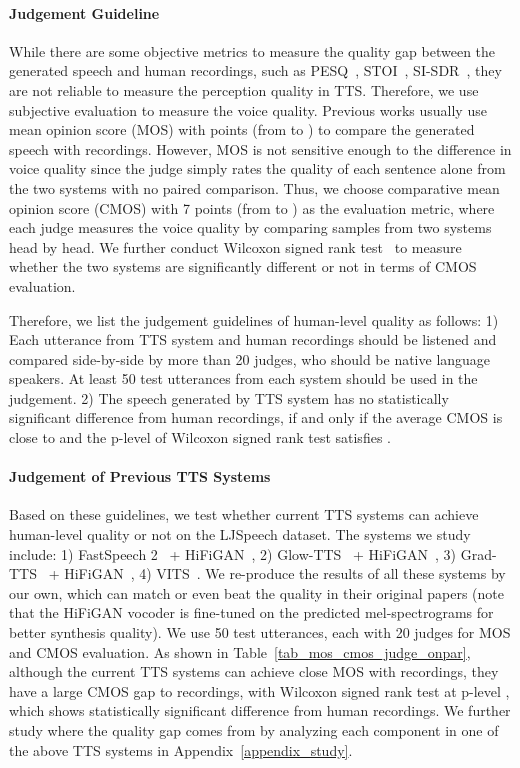 \documentclass{article}
\theoremstyle{definition}
\begin{document}
\paragraph{Judgement Guideline} While there are some objective metrics to measure the quality gap between the generated speech and human recordings, such as PESQ~\citep{rix2001perceptual}, STOI~\citep{taal2011algorithm}, SI-SDR~\citep{le2019sdr}, they are not reliable to measure the perception quality in TTS. Therefore, we use subjective evaluation to measure the voice quality. Previous works usually use mean opinion score (MOS) with  points (from  to ) to compare the generated speech with recordings. However, MOS is not sensitive enough to the difference in voice quality since the judge simply rates the quality of each sentence alone from the two systems with no paired comparison. Thus, we choose comparative mean opinion score (CMOS) with 7 points (from  to ) as the evaluation metric, where each judge measures the voice quality by comparing samples from two systems head by head. We further conduct Wilcoxon signed rank test~\citep{wilcoxon1992individual} to measure whether the two systems are significantly different or not in terms of CMOS evaluation. 

Therefore, we list the judgement guidelines of human-level quality as follows: 1) Each utterance from TTS system and human recordings should be listened and compared side-by-side by more than 20 judges, who should be native language speakers. At least 50 test utterances from each system should be used in the judgement.
2) The speech generated by TTS system has no statistically significant difference from human recordings, if and only if the average CMOS is close to  and the p-level of Wilcoxon signed rank test satisfies . 

\paragraph{Judgement of Previous TTS Systems} 
Based on these guidelines, we test whether current TTS systems can achieve human-level quality or not on the LJSpeech dataset. The systems we study include: 1) FastSpeech 2~\citep{ren2021fastspeech} + HiFiGAN~\citep{kong2020hifi}, 2) Glow-TTS~\citep{kim2020glow} + HiFiGAN~\citep{kong2020hifi}, 3) Grad-TTS~\citep{popov2021grad} + HiFiGAN~\citep{kong2020hifi}, 4) VITS~\citep{kim2021conditional}. We re-produce the results of all these systems by our own, which can match or even beat the quality in their original papers (note that the HiFiGAN vocoder is fine-tuned on the predicted mel-spectrograms for better synthesis quality). We use 50 test utterances, each with 20 judges for MOS and CMOS evaluation. As shown in Table~\ref{tab_mos_cmos_judge_onpar}, although the current TTS systems can achieve close MOS with recordings, they have a large CMOS gap to recordings, with Wilcoxon signed rank test at p-level , which shows statistically significant difference from human recordings. We further study where the quality gap comes from by analyzing each component in one of the above TTS systems in Appendix~\ref{appendix_study}.  
\end{document}
